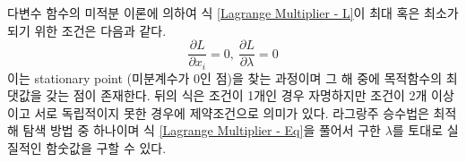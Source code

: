 다변수 함수의 미적분 이론에 의하여 식 \ref{Lagrange Multiplier - L}이 최대 혹은 최소가 되기 위한 조건은 다음과 같다.
\begin{equation}
    \frac{\partial L}{\partial x_{i}} = 0,~\frac{\partial L}{\partial \lambda} = 0
    \label{Lagrange Multiplier - Eq}
\end{equation}
이는 stationary point (미분계수가 0인 점)을 찾는 과정이며 그 해 중에 목적함수의 최댓값을 갖는 점이 존재한다. 뒤의 식은 조건이 1개인 경우 자명하지만 조건이 2개 이상이고 서로 독립적이지 못한 경우에 제약조건으로 의미가 있다. 라그랑주 승수법은 최적해 탐색 방법 중 하나이며 식 \ref{Lagrange Multiplier - Eq}을 풀어서 구한 $\lambda$를 토대로 실질적인 함숫값을 구할 수 있다.

